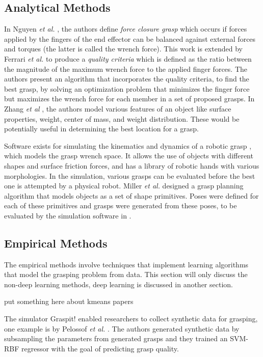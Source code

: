 \documentclass{article}
\begin{document}
\subsection{Analytical Methods}
In Nguyen \textit{et al.} \cite{nguyen86}, the authors define
\textit{force closure grasp}
which occurs if forces applied by the fingers of the end
effector can be balanced against external forces and torques
(the latter is called the wrench force). This work is extended by Ferrari
\textit{et al.} \cite{ferrari92} to produce a \textit{quality criteria}
which is defined as
the ratio between the magnitude of the maximum wrench force to the
applied finger forces. The authors present an algorithm that incorporates the
quality criteria, to find the best grasp, by solving an optimization problem
that minimizes the finger force but maximizes the wrench force for each member
in a set of proposed grasps. In Zhang \textit{et al} \cite{zhang12}, the authors
model various features of an object like surface properties, weight, center
of mass, and weight distribution. These would be potentially useful in
determining the best location for a grasp.

Software exists for simulating the kinematics and dynamics of a robotic
grasp \cite{miller04}, which models the grasp wrench space. It allows the use
of objects with different shapes and surface friction forces, and has a library
of robotic hands with various morphologies. In the simulation, various grasps
can be evaluated before the best one is attempted by a physical robot. Miller
\textit{et al.} \cite{miller03} designed a grasp planning algorithm that
models objects as a
set of shape primitives. Poses were defined for each of
these primitives and grasps
were generated from these poses, to be evaluated by the simulation software in
\cite{miller04}.

\subsection{Empirical Methods}
The empirical methods involve techniques that implement learning algorithms that
model the grasping problem from data. This section will only discuss the
non-deep learning methods, deep learning is discussed in another section.

put something here about kmeans papers \cite{coelho01,piater02}

The simulator Graspit! \cite{miller04} enabled researchers to collect synthetic
data for grasping, one example is by Pelossof \textit{et al.} \cite{pelossof04}.
The authors generated synthetic data by subsampling the parameters from
generated grasps and they trained an
SVM-RBF regressor with the goal of predicting grasp quality.
\end{document}
